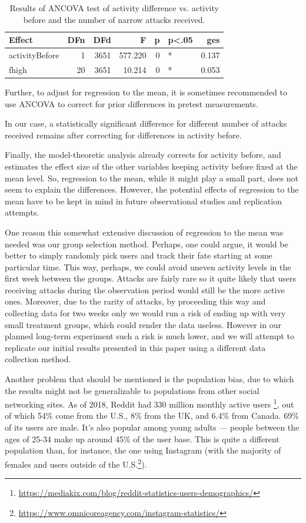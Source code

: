 \documentclass[a4paper,fleqn]{cas-dc}
\begin{document}
\begin{table}
\footnotesize
\begin{tabular}{l|r|r|r|r|l|r}
\hline
Effect & DFn & DFd & F & p & p<.05 & ges\\
\hline
activityBefore & 1 & 3651 & 577.220 & 0 & * & 0.137\\
\hline
fhigh & 20 & 3651 & 10.214 & 0 & * & 0.053\\
\hline
\end{tabular}
\normalsize 
\caption{Results of ANCOVA test of activity difference vs. activity before and the number of narrow attacks received.}
\end{table}

Further, to adjust for regression to the mean, it is sometimes
recommended to use ANCOVA to correct for prior differences in pretest
measurements.

\noindent In our case, a statistically significant difference for
different number of attacks received remains after correcting for
differences in activity before.

Finally, the model-theoretic analysis already corrects for activity
before, and estimates the effect size of the other variables keeping
activity before fixed at the mean level. So, regression to the mean,
while it might play a small part, does not seem to explain the
differences. However, the potential effects of regression to the mean
have to be kept in mind in future observational studies and replication
attempts.

One reason this somewhat extensive discussion of regression to the mean
was needed was our group selection method. Perhaps, one could argue, it
would be better to simply randomly pick users and track their fate
starting at some particular time. This way, perhaps, we could avoid
uneven activity levels in the first week between the groups. Attacks are
fairly rare so it quite likely that users receiving attacks during the
observation period would still be the more active ones. Moreover, due to
the rarity of attacks, by proceeding this way and collecting data for
two weeks only we would run a risk of ending up with very small
treatment groups, which could render the data useless. However in our
planned long-term experiment such a risk is much lower, and we will
attempt to replicate our initial results presented in this paper using a
different data collection method.

Another problem that should be mentioned is the population bias, due to
which the results might not be generalizable to populations from other
social networking sites. As of 2018, Reddit had 330 million monthly
active users
\footnote{\url{https://mediakix.com/blog/reddit-statistics-users-demographics/}},
out of which 54\% come from the U.S., 8\% from the UK, and 6.4\% from
Canada. 69\% of its users are male. It's also popular among young adults
--- people between the ages of 25-34 make up around 45\% of the user
base. This is quite a different population than, for instance, the one
using Instagram (with the majority of females and users outside of the
U.S.\footnote{\url{https://www.omnicoreagency.com/instagram-statistics/}}).
\end{document}
